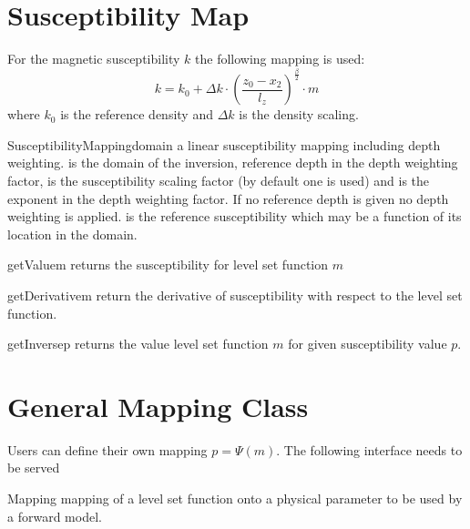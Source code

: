 \section{Susceptibility Map}\label{Chp:ref:mapping susceptibility}
For the magnetic susceptibility $k$ the following mapping is used:
\begin{equation}\label{EQU:MAP:2}
k=  k_{0} + \Delta k \cdot \left( \frac{z_0-x_2}{l_z} \right)^{\frac{\beta}{2}}  \cdot m 
\end{equation}  
where $k_{0}$ is the reference density and $\Delta k$ is the density scaling.

\begin{classdesc}{SusceptibilityMapping}{domain
        }
a linear susceptibility mapping including depth weighting.
 is the domain of the inversion,  reference depth in
the depth weighting factor,  is the susceptibility scaling factor
(by default one is used) and  is the exponent in the depth
weighting factor. If no reference depth  is given no depth
weighting is applied.
 is the reference susceptibility which may be a function of its
location in the domain. 
\end{classdesc}

\begin{methoddesc}[SusceptibilityMapping]{getValue}{m}
returns the susceptibility for level set function $m$
\end{methoddesc}

\begin{methoddesc}[SusceptibilityMapping]{getDerivative}{m}
return the derivative of susceptibility  with respect to the level set function.
\end{methoddesc}  

\begin{methoddesc}[SusceptibilityMapping]{getInverse}{p}
returns the value level set function $m$ for given susceptibility value $p$.
\end{methoddesc}


\section{General Mapping Class}
Users can define their own mapping $p=\Psi(m)$.
The following interface needs to be served

\begin{classdesc}{Mapping}{}
mapping of a level set function onto a physical parameter to be used by a
forward model.
\end{classdesc} 

